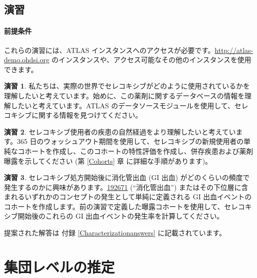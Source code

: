 \documentclass[
  11pt]{book}
\theoremstyle{definition}
\theoremstyle{definition}
\theoremstyle{definition}
\newtheorem{exercise}{演習}[chapter]
\theoremstyle{definition}
\theoremstyle{remark}
\begin{document}
\section{演習}\label{ux6f14ux7fd2-6}

\subsubsection*{前提条件}\label{ux524dux63d0ux6761ux4ef6-6}

これらの演習には、ATLAS インスタンスへのアクセスが必要です。\url{http://atlas-demo.ohdsi.org} のインスタンスや、アクセス可能なその他のインスタンスを使用できます。

\begin{exercise}
\protect\hypertarget{exr:exerciseCharacterization1}{}\label{exr:exerciseCharacterization1}私たちは、実際の世界でセレコキシブがどのように使用されているかを理解したいと考えています。始めに、この薬剤に関するデータベースの情報を理解したいと考えています。ATLAS のデータソースモジュールを使用して、セレコキシブに関する情報を見つけてください。
\end{exercise}

\begin{exercise}
\protect\hypertarget{exr:exerciseCharacterization2}{}\label{exr:exerciseCharacterization2}セレコキシブ使用者の疾患の自然経過をより理解したいと考えています。365 日のウォッシュアウト期間を使用して、セレコキシブの新規使用者の単純なコホートを作成し、このコホートの特性評価を作成し、併存疾患および薬剤曝露を示してください (第 \ref{Cohorts} 章 に詳細な手順があります)。
\end{exercise}

\begin{exercise}
\protect\hypertarget{exr:exerciseCharacterization3}{}\label{exr:exerciseCharacterization3}セレコキシブ処方開始後に消化管出血 (GI 出血) がどのくらいの頻度で発生するのかに興味があります。\href{http://athena.ohdsi.org/search-terms/terms/192671}{192671} (``消化管出血'') またはその下位層に含まれるいずれかのコンセプトの発生として単純に定義される GI 出血イベントのコホートを作成します。前の演習で定義した曝露コホートを使用して、セレコキシブ開始後のこれらの GI 出血イベントの発生率を計算してください。
\end{exercise}

提案された解答は 付録 \ref{Characterizationanswers} に記載されています。

\chapter{集団レベルの推定}\label{PopulationLevelEstimation}
\end{document}
